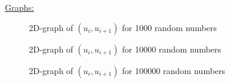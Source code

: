 \documentclass[11pt]{article}
\begin{document}
\underline{Graphs:}
\begin{figure}[H]
	\centering
	\caption{2D-graph of $(u_i,u_{i+1})$ for 1000 random numbers}
\end{figure}
\begin{figure}[H]
	\centering
	\caption{2D-graph of $(u_i,u_{i+1})$ for 10000 random numbers}
\end{figure}
\begin{figure}[H]
	\centering
	\caption{2D-graph of $(u_i,u_{i+1})$ for 100000 random numbers}
\end{figure}
\end{document}
